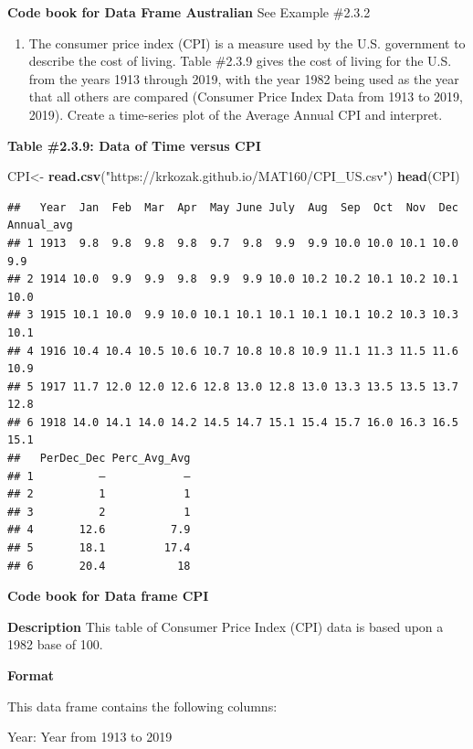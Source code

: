 \documentclass[
]{book}
\newenvironment{Shaded}{\begin{snugshade}}{\end{snugshade}}
\newcommand{\KeywordTok}[1]{\textcolor[rgb]{0.13,0.29,0.53}{\textbf{#1}}}
\newcommand{\NormalTok}[1]{#1}
\newcommand{\StringTok}[1]{\textcolor[rgb]{0.31,0.60,0.02}{#1}}
\providecommand{\tightlist}{%
  \setlength{\itemsep}{0pt}\setlength{\parskip}{0pt}}
\begin{document}
\textbf{Code book for Data Frame Australian} See Example \#2.3.2

\begin{enumerate}
\def\labelenumi{\arabic{enumi}.}
\setcounter{enumi}{6}
\tightlist
\item
  The consumer price index (CPI) is a measure used by the U.S. government to describe the cost of living. Table \#2.3.9 gives the cost of living for the U.S. from the years 1913 through 2019, with the year 1982 being used as the year that all others are compared (Consumer Price Index Data from 1913 to 2019, 2019). Create a time-series plot of the Average Annual CPI and interpret.
\end{enumerate}

\textbf{Table \#2.3.9: Data of Time versus CPI}

\begin{Shaded}
\begin{Highlighting}[]
\NormalTok{CPI<-}\StringTok{ }\KeywordTok{read.csv}\NormalTok{(}\StringTok{"https://krkozak.github.io/MAT160/CPI_US.csv"}\NormalTok{)}
\KeywordTok{head}\NormalTok{(CPI)}
\end{Highlighting}
\end{Shaded}

\begin{verbatim}
##   Year  Jan  Feb  Mar  Apr  May June July  Aug  Sep  Oct  Nov  Dec Annual_avg
## 1 1913  9.8  9.8  9.8  9.8  9.7  9.8  9.9  9.9 10.0 10.0 10.1 10.0        9.9
## 2 1914 10.0  9.9  9.9  9.8  9.9  9.9 10.0 10.2 10.2 10.1 10.2 10.1       10.0
## 3 1915 10.1 10.0  9.9 10.0 10.1 10.1 10.1 10.1 10.1 10.2 10.3 10.3       10.1
## 4 1916 10.4 10.4 10.5 10.6 10.7 10.8 10.8 10.9 11.1 11.3 11.5 11.6       10.9
## 5 1917 11.7 12.0 12.0 12.6 12.8 13.0 12.8 13.0 13.3 13.5 13.5 13.7       12.8
## 6 1918 14.0 14.1 14.0 14.2 14.5 14.7 15.1 15.4 15.7 16.0 16.3 16.5       15.1
##   PerDec_Dec Perc_Avg_Avg
## 1          –            –
## 2          1            1
## 3          2            1
## 4       12.6          7.9
## 5       18.1         17.4
## 6       20.4           18
\end{verbatim}

\textbf{Code book for Data frame CPI}

\textbf{Description}
This table of Consumer Price Index (CPI) data is based upon a 1982 base of 100.

\textbf{Format}

This data frame contains the following columns:

Year: Year from 1913 to 2019
\end{document}
